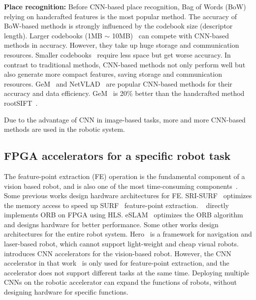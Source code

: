 \textbf{Place recognition:} Before CNN-based place recognition, Bag of Words (BoW)~\cite{small_1} relying on handcrafted features is the most popular method. The accuracy of BoW-based methods is strongly influenced by the codebook size (descriptor length). Larger codebooks (1MB $\sim$ 10MB)~\cite{large_1, large_2} can compete with CNN-based methods in accuracy. However, they take up huge storage and communication resources. Smaller codebooks~\cite{small_1, small_2, jegou2014triang} require less space but get worse accuracy. In contrast to traditional methods, CNN-based methods not only perform well but also generate more compact features, saving storage and communication resources. GeM~\cite{radenovic2018fine} and NetVLAD~\cite{arandjelovic2016netvlad} are popular CNN-based methods for their accuracy and data efficiency. GeM~\cite{radenovic2018fine} is 20\% better than the handcrafted method rootSIFT~\cite{jegou2014triang}.

Due to the advantage of CNN in image-based tasks, more and more CNN-based methods are used in the robotic system.


\subsection{ FPGA accelerators for a specific robot task }

The feature-point extraction (FE) operation is the fundamental component of a vision based robot, and is also one of the most time-consuming components~\cite{fang2017fpga}.
Some previous works design hardware architectures for FE.
SRI-SURF~\cite{jia2016sri} optimizes the memory access to speed up SURF~\cite{bay2006surf} feature-point extraction. 
~\cite{fang2017fpga} directly implements ORB on FPGA using HLS. eSLAM~\cite{liu2019eslam} optimizes the ORB algorithm and designs hardware for better performance.
Some other works design architectures for the entire robot system. Hero~\cite{shi2018hero} is a framework for navigation and laser-based robot, which cannot support light-weight and cheap visual robots. 
~\cite{li2019879gops} introduces CNN accelerators for the vision-based robot. 
However, the CNN accelerator in that work~\cite{li2019879gops} is only used for feature-point extraction, and the accelerator does not support different tasks at the same time. 
Deploying multiple CNNs on the robotic accelerator can expand the functions of robots, without designing hardware for specific functions.



